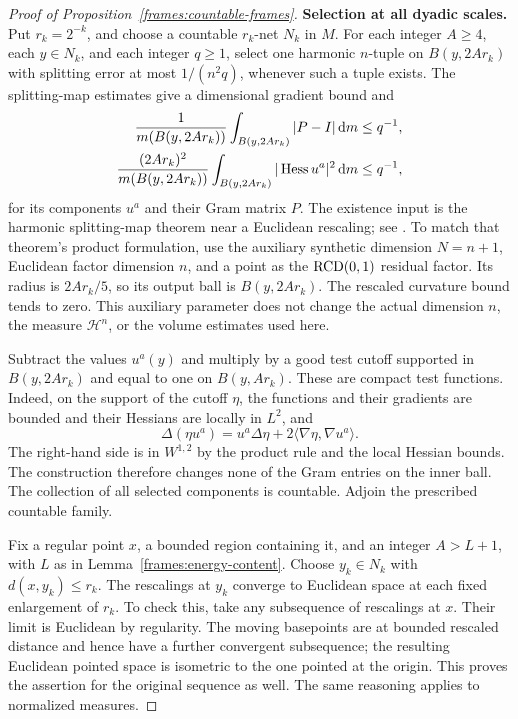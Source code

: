 \begin{proof}[Proof of Proposition~\ref{frames:countable-frames}]
 \textbf{Selection at all dyadic scales.}
 Put $r_k=2^{-k}$, and choose a countable $r_k$-net $N_k$ in $M$.
 For each integer $A\geq4$, each $y\in N_k$, and each integer $q\geq1$,
 select one harmonic $n$-tuple on $B(y,2Ar_k)$ with splitting error
 at most $1/(n^2q)$, whenever such a tuple exists.  The splitting-map
 estimates give a dimensional gradient bound and
 \begin{align*}
  \frac{1}{m(B(y,2Ar_k))}\int_{B(y,2Ar_k)}|P-I|\,\mathrm d m&\leq q^{-1},\\
  \frac{(2Ar_k)^2}{m(B(y,2Ar_k))}
          \int_{B(y,2Ar_k)}|\operatorname{Hess} u^a|^2\,\mathrm d m&\leq q^{-1},
 \end{align*}
 for its components $u^a$ and their Gram matrix $P$.
 The existence input is the harmonic splitting-map theorem near a
 Euclidean rescaling; see \cite[Proposition~1.4]{BPS2021}.
 To match that theorem's product formulation, use the auxiliary
 synthetic dimension \(N=n+1\), Euclidean factor dimension \(n\),
 and a point as the \(\mathrm{RCD}(0,1)\) residual factor. Its radius is
 \(2Ar_k/5\), so its output ball is \(B(y,2Ar_k)\). The rescaled
 curvature bound tends to zero. This auxiliary parameter does not
 change the actual dimension \(n\), the measure \(\mathcal H^n\),
 or the volume estimates used here.

 Subtract the values $u^a(y)$ and multiply by a good test cutoff
 supported in $B(y,2Ar_k)$ and equal to one on $B(y,Ar_k)$.
 These are compact test functions.  Indeed, on the support of the
 cutoff $\eta$, the functions and their gradients are bounded and
 their Hessians are locally in $L^2$, and
 \[
  \Delta(\eta u^a)=u^a\Delta\eta
                       +2\langle\nabla\eta,\nabla u^a\rangle.
 \]
 The right-hand side is in $W^{1,2}$ by the product rule and the
 local Hessian bounds.  The construction therefore changes none of
 the Gram entries on the inner ball.  The collection of all selected
 components is countable.  Adjoin the prescribed countable family.

 Fix a regular point $x$, a bounded region containing it, and an
 integer $A>L+1$, with $L$ as in
 Lemma~\ref{frames:energy-content}.  Choose $y_k\in N_k$ with
 $d(x,y_k)\leq r_k$.  The rescalings at $y_k$ converge to Euclidean
 space at each fixed enlargement of $r_k$.  To check this, take any
 subsequence of rescalings at $x$.  Their limit is Euclidean by
 regularity.  The moving basepoints are at bounded rescaled
 distance and hence have a further convergent subsequence; the
 resulting Euclidean pointed space is isometric to the one pointed
 at the origin.  This proves the assertion for the original sequence
 as well.  The same reasoning applies to normalized measures.


\end{proof}
